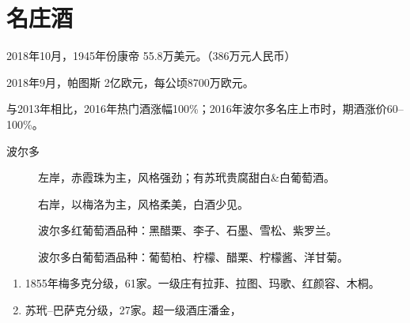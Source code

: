 \documentclass{dingjia}
\begin{document}
\chapter{名庄酒}

2018年10月，1945年份康帝 55.8万美元。（386万元人民币）

2018年9月，帕图斯 2亿欧元，每公顷8700万欧元。

与2013年相比，2016年热门酒涨幅100\%；2016年波尔多名庄上市时，期酒涨价60--100\%。

\begin{description}
\item[波尔多] 左岸，赤霞珠为主，风格强劲；有苏玳贵腐甜白\&白葡萄酒。

  右岸，以梅洛为主，风格柔美，白酒少见。

  波尔多红葡萄酒品种：黑醋栗、李子、石墨、雪松、紫罗兰。

  波尔多白葡萄酒品种：葡萄柏、柠檬、醋栗、柠檬酱、洋甘菊。
\end{description}

\begin{enumerate}
\item 1855年梅多克分级，61家。一级庄有拉菲、拉图、玛歌、红颜容、木桐。
\item 苏玳--巴萨克分级，27家。超一级酒庄潘金，
\end{enumerate}
\end{document}
